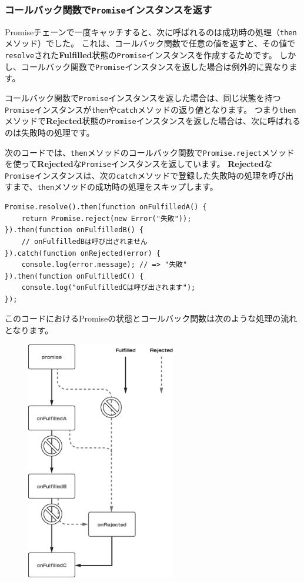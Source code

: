 \hypertarget{promise-then-return-promise}{%
\subsubsection{\texorpdfstring{コールバック関数で\texttt{Promise}インスタンスを返す}{コールバック関数でPromiseインスタンスを返す}}\label{promise-then-return-promise}}

Promiseチェーンで一度キャッチすると、次に呼ばれるのは成功時の処理（\texttt{then}メソッド）でした。
これは、コールバック関数で任意の値を返すと、その値で\texttt{resolve}された\textbf{Fulfilled}状態の\texttt{Promise}インスタンスを作成するためです。
しかし、コールバック関数で\texttt{Promise}インスタンスを返した場合は例外的に異なります。

コールバック関数で\texttt{Promise}インスタンスを返した場合は、同じ状態を持つ\texttt{Promise}インスタンスが\texttt{then}や\texttt{catch}メソッドの返り値となります。
つまり\texttt{then}メソッドで\textbf{Rejected}状態の\texttt{Promise}インスタンスを返した場合は、次に呼ばれるのは失敗時の処理です。

次のコードでは、\texttt{then}メソッドのコールバック関数で\texttt{Promise.reject}メソッドを使って\textbf{Rejected}な\texttt{Promise}インスタンスを返しています。
\textbf{Rejected}な\texttt{Promise}インスタンスは、次の\texttt{catch}メソッドで登録した失敗時の処理を呼び出すまで、\texttt{then}メソッドの成功時の処理をスキップします。

\begin{lstlisting}
Promise.resolve().then(function onFulfilledA() {
    return Promise.reject(new Error("失敗"));
}).then(function onFulfilledB() {
    // onFulfilledBは呼び出されません
}).catch(function onRejected(error) {
    console.log(error.message); // => "失敗"
}).then(function onFulfilledC() {
    console.log("onFulfilledCは呼び出されます");
});
\end{lstlisting}

このコードにおけるPromiseの状態とコールバック関数は次のような処理の流れとなります。
\newpage
\begin{figure}[h]
\centering
\includegraphics[width=65mm]{./fig/then-rejected-promise.eps}
\end{figure}

